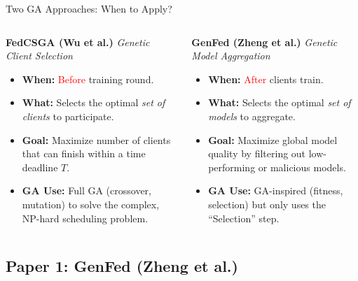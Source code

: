 \documentclass{beamer}
\begin{document}
\begin{frame}{Two GA Approaches: When to Apply?}
\begin{columns}[T]
\begin{column}{0.48\textwidth}
\textbf{\textcolor{fedcsgaorange}{FedCSGA} (Wu et al.)}
\textit{Genetic Client Selection}
\begin{itemize}
    \item \textbf{When:} \textcolor{red}{Before} training round.
    \item \textbf{What:} Selects the optimal \textit{set of clients} to participate.
    \item \textbf{Goal:} Maximize number of clients that can finish within a time deadline $T$.
    \item \textbf{GA Use:} Full GA (crossover, mutation) to solve the complex, NP-hard scheduling problem.
\end{itemize}
\end{column}

\begin{column}{0.48\textwidth}
\textbf{\textcolor{genfedblue}{GenFed} (Zheng et al.)}
\textit{Genetic Model Aggregation}
\begin{itemize}
    \item \textbf{When:} \textcolor{red}{After} clients train.
    \item \textbf{What:} Selects the optimal \textit{set of models} to aggregate.
    \item \textbf{Goal:} Maximize global model quality by filtering out low-performing or malicious models.
    \item \textbf{GA Use:} GA-inspired (fitness, selection) but only uses the ``Selection'' step.
\end{itemize}
\end{column}
\end{columns}
\end{frame}

\subsection{Paper 1: GenFed (Zheng et al.)}
\end{document}
